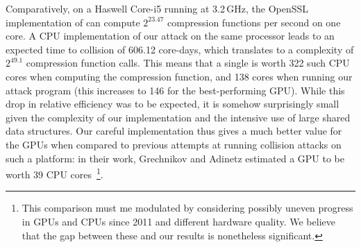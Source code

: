Comparatively, on a Haswell Core-i5 running at 3.2\,GHz, the OpenSSL implementation of \shaone
can compute $2^{23.47}$ compression functions per second on one core. A CPU implementation of our attack
on the same processor leads to an expected time to collision of 606.12 core-days, which translates to a complexity of $2^{49.1}$
compression function calls.
This means that a single \gtx is worth 322 such CPU cores when computing the \shaone compression function, and 138 cores when
running our attack program (this increases to 146 for the best-performing GPU).
While this drop in relative efficiency was to be expected, it is somehow surprisingly small given the
complexity of our implementation and \eg the intensive use of large shared data structures. Our careful implementation thus
gives a much better value for the GPUs when compared to previous attempts at running collision attacks on such a platform:
in their work, Grechnikov and Adinetz estimated a GPU to be worth 39 CPU cores~\cite{cryptoeprint:2011:641}\footnote{This comparison must me modulated by considering possibly uneven progress in GPUs and CPUs
since 2011 and different hardware quality. We believe that the gap between these and our results is nonetheless significant.}.
